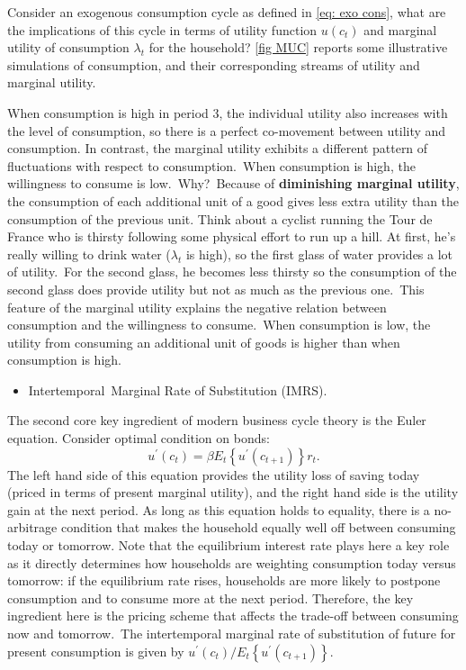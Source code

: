 \documentclass[a4paper,12pt]{article}%
\begin{document}
Consider an exogenous consumption cycle as defined in \autoref{eq: exo cons},
what are the implications of this cycle in terms of utility function
$u(c_{t})$ and marginal utility of consumption $\lambda_{t}$ for the
household? \autoref{fig MUC} reports some illustrative simulations of
consumption, and their corresponding streams of utility and marginal utility.

When consumption is high in period 3, the individual utility also increases
with the level of consumption, so there is a perfect co-movement between
utility and consumption. In contrast, the marginal utility exhibits a
different pattern of fluctuations with respect to consumption.\ When
consumption is high, the willingness to consume is low.\ Why?\ Because of
\textbf{diminishing marginal utility}, the consumption of each additional unit
of a good gives less extra utility than the consumption of the previous unit.
Think about a cyclist running the Tour de France who is thirsty following some
physical effort to run up a hill. At first, he's really willing to drink water
($\lambda_{t}$ is high), so the first glass of water provides a lot of
utility.\ For the second glass, he becomes less thirsty so the consumption of
the second glass does provide utility but not as much as the previous
one.\ This feature of the marginal utility explains the negative relation
between consumption and the willingness to consume.\ When consumption is low,
the utility from consuming an additional unit of goods is higher than when
consumption is high.

\begin{itemize}
\item \textsf{Intertemporal\ Marginal Rate of Substitution (IMRS).}
\end{itemize}

The second core key ingredient of modern business cycle theory is the Euler
equation. Consider optimal condition on bonds:
\begin{equation}
u^{\prime}(c_{t})=\beta E_{t}\left\{  u^{\prime}(c_{t+1})\right\}  r_{t}.
\label{eq FOC3}%
\end{equation}
The left hand side of this equation provides the utility loss of saving today
(priced in terms of present marginal utility), and the right hand side is the
utility gain at the next period. As long as this equation holds to equality,
there is a no-arbitrage condition that makes the household equally well off
between consuming today or tomorrow. Note that the equilibrium interest rate
plays here a key role as it directly determines how households are weighting
consumption today versus tomorrow: if the equilibrium rate rises, households
are more likely to postpone consumption and to consume more at the next
period. Therefore, the key ingredient here is the pricing scheme that affects
the trade-off between consuming now and tomorrow.\ The intertemporal marginal
rate of substitution of future for present consumption is given by $u^{\prime
}(c_{t})/E_{t}\left\{  u^{\prime}(c_{t+1})\right\}  $.
\end{document}
